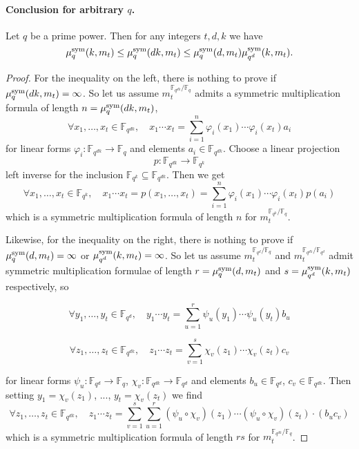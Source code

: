 \documentclass[11pt]{article}
\begin{document}
\paragraph{Conclusion for arbitrary $q$.}

\begin{lm}
\label{lemma:basechange}
Let $q$ be a prime power. Then for any integers $t,d,k$ we have
\[ \mu^{\textrm{sym}}_q(k,m_t)\leq\mu^{\textrm{sym}}_q(dk,m_t)\leq\mu^{\textrm{sym}}_q(d,m_t)\mu^{\textrm{sym}}_{q^d}(k,m_t). \]
\end{lm}
\begin{proof}
For the inequality on the left, there is nothing to prove if $\mu^{\textrm{sym}}_q(dk,m_t)=\infty$.
So let us assume $m_t^{\mathbb{F}_{q^{dk}}/\mathbb{F}_{q}}$ admits a symmetric multiplication formula of length $n=\mu^{\textrm{sym}}_q(dk,m_t)$, \ie
\[\forall x_1,\dots,x_t\in\mathbb{F}_{q^{dk}},\quad x_1\cdots x_t = \sum_{i=1}^{n}\varphi_i(x_1)\cdots\varphi_i(x_t)a_i \]
for linear forms $\varphi_i:\mathbb{F}_{q^{dk}}\to\mathbb{F}_{q}$ and elements $a_i\in\mathbb{F}_{q^{dk}}$.
Choose a linear projection
\[ p:\mathbb{F}_{q^{dk}}\to\mathbb{F}_{q^{k}} \]
left inverse for the inclusion $\mathbb{F}_{q^{k}}\subseteq\mathbb{F}_{q^{dk}}$.
Then we get
\[\forall x_1,\dots,x_t\in\mathbb{F}_{q^{k}},\quad x_1\cdots x_t = p(x_1,\dots,x_t) = \sum_{i=1}^{n}\varphi_i(x_1)\cdots\varphi_i(x_t)p(a_i) \]
which is a symmetric multiplication formula of length $n$ for $m_t^{\mathbb{F}_{q^{k}}/\mathbb{F}_{q}}$.

Likewise, for the inequality on the right, there is nothing to prove if $\mu^{\textrm{sym}}_q(d,m_t)=\infty$ or $\mu^{\textrm{sym}}_{q^d}(k,m_t)=\infty$.
So let us assume $m_t^{\mathbb{F}_{q^{d}}/\mathbb{F}_{q}}$ and $m_t^{\mathbb{F}_{q^{dk}}/\mathbb{F}_{q^{d}}}$ admit symmetric multiplication formulae of length $r=\mu^{\textrm{sym}}_q(d,m_t)$ and $s=\mu^{\textrm{sym}}_{q^d}(k,m_t)$ respectively, so
\vspace{-.5\baselineskip}

\[\forall y_1,\dots,y_t\in\mathbb{F}_{q^{d}},\quad y_1\cdots y_t = \sum_{u=1}^{r}\psi_u(y_1)\cdots\psi_u(y_t)b_u \]
\vspace{-1.5\baselineskip}

\[\forall z_1,\dots,z_t\in\mathbb{F}_{q^{dk}},\quad z_1\cdots z_t = \sum_{v=1}^{s}\chi_v(z_1)\cdots\chi_v(z_t)c_v \]
\vspace{-.5\baselineskip}

\noindent for linear forms $\psi_u:\mathbb{F}_{q^{d}}\to\mathbb{F}_{q}$, $\chi_v:\mathbb{F}_{q^{dk}}\to\mathbb{F}_{q^{d}}$ and elements $b_u\in\mathbb{F}_{q^{d}}$, $c_v\in\mathbb{F}_{q^{dk}}$.
Then setting $y_1=\chi_v(z_1)$, ..., $y_t=\chi_v(z_t)$ we find
\[\forall z_1,\dots,z_t\in\mathbb{F}_{q^{dk}},\quad z_1\cdots z_t = \sum_{v=1}^{s}\sum_{u=1}^{r}(\psi_u\circ\chi_v)(z_1)\cdots(\psi_u\circ\chi_v)(z_t)\cdot(b_uc_v) \]
which is a symmetric multiplication formula of length $rs$ for $m_t^{\mathbb{F}_{q^{dk}}/\mathbb{F}_{q}}$.
\end{proof}
\end{document}
